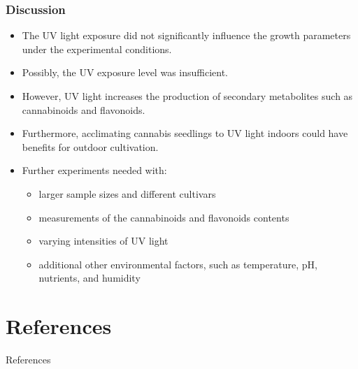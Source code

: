 \documentclass[
    12pt,
    aspectratio=1610,
    b,
    bibliography=../bibliography.bib,
    link-citations]{beamer}
\begin{document}
    \begin{frame}
        \frametitle{Discussion}
        \begin{itemize}
            \item The UV light exposure did not significantly influence the growth parameters under the experimental conditions.
            \item Possibly, the UV exposure level was insufficient.
            \item However, UV light increases the production of secondary metabolites such as cannabinoids and flavonoids.
            \item Furthermore, acclimating cannabis seedlings to UV light indoors could have benefits for outdoor cultivation.
            \item Further experiments needed with:
            \begin{itemize}
                \item larger sample sizes and different cultivars
                \item measurements of the cannabinoids and flavonoids contents
                \item varying intensities of UV light
                \item additional other environmental factors, such as temperature, pH, nutrients, and humidity
            \end{itemize}
        \end{itemize}
    \end{frame}

    \section{References}

    \begin{frame}[allowframebreaks]{References}
        \printbibliography[heading=none]
    \end{frame}
\end{document}
